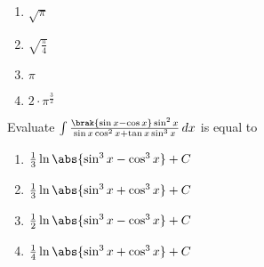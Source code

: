 \hfill{}
	\begin{enumerate}
    \item $\sqrt{\pi}$
    \item $\sqrt{\frac{\pi}{4}}$
    \item $\pi$
    \item $2\cdot\pi^\frac{3}{2}$
\end{enumerate}
\item Evaluate $\int \frac{\brak{\sin x - \cos x} \sin^2 x}{\sin x\cos^2 x + \tan x\sin^3 x} \, dx$ is equal to
\hfill{}
	\begin{enumerate}
    \item $\frac{1}{3} \ln \abs{\sin^3 x - \cos^3 x} + C$
    \item $\frac{1}{3} \ln \abs{\sin^3 x + \cos^3 x} + C$
    \item $\frac{1}{2} \ln \abs{\sin^3 x - \cos^3 x} + C$
    \item $\frac{1}{4} \ln \abs{\sin^3 x + \cos^3 x} + C$
\end{enumerate}
